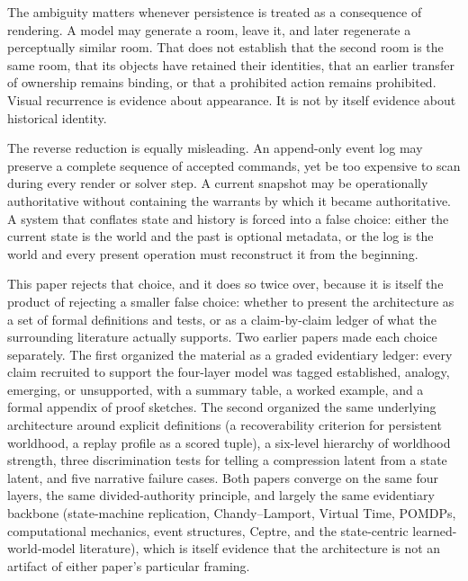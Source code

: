 \documentclass[11pt]{article}
\begin{document}
The ambiguity matters whenever persistence is treated as a consequence of rendering. A model may generate a room, leave it, and later regenerate a perceptually similar room. That does not establish that the second room is the same room, that its objects have retained their identities, that an earlier transfer of ownership remains binding, or that a prohibited action remains prohibited. Visual recurrence is evidence about appearance. It is not by itself evidence about historical identity.

The reverse reduction is equally misleading. An append-only event log may preserve a complete sequence of accepted commands, yet be too expensive to scan during every render or solver step. A current snapshot may be operationally authoritative without containing the warrants by which it became authoritative. A system that conflates state and history is forced into a false choice: either the current state is the world and the past is optional metadata, or the log is the world and every present operation must reconstruct it from the beginning.

This paper rejects that choice, and it does so twice over, because it is itself the product of rejecting a smaller false choice: whether to present the architecture as a set of formal definitions and tests, or as a claim-by-claim ledger of what the surrounding literature actually supports. Two earlier papers made each choice separately. The first organized the material as a graded evidentiary ledger: every claim recruited to support the four-layer model was tagged established, analogy, emerging, or unsupported, with a summary table, a worked example, and a formal appendix of proof sketches. The second organized the same underlying architecture around explicit definitions (a recoverability criterion for persistent worldhood, a replay profile as a scored tuple), a six-level hierarchy of worldhood strength, three discrimination tests for telling a compression latent from a state latent, and five narrative failure cases. Both papers converge on the same four layers, the same divided-authority principle, and largely the same evidentiary backbone (state-machine replication, Chandy--Lamport, Virtual Time, POMDPs, computational mechanics, event structures, Ceptre, and the state-centric learned-world-model literature), which is itself evidence that the architecture is not an artifact of either paper's particular framing.
\end{document}
